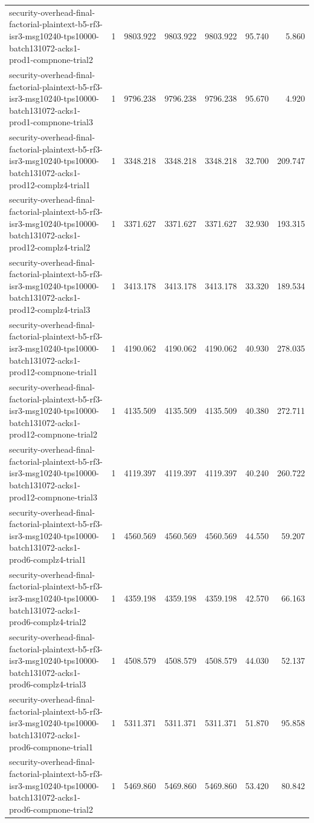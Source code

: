 \begin{tabular}{lrrrrrr}
security-overhead-final-factorial-plaintext-b5-rf3-isr3-msg10240-tps10000-batch131072-acks1-prod1-compnone-trial2 & 1 & 9803.922 & 9803.922 & 9803.922 & 95.740 & 5.860 \\
security-overhead-final-factorial-plaintext-b5-rf3-isr3-msg10240-tps10000-batch131072-acks1-prod1-compnone-trial3 & 1 & 9796.238 & 9796.238 & 9796.238 & 95.670 & 4.920 \\
security-overhead-final-factorial-plaintext-b5-rf3-isr3-msg10240-tps10000-batch131072-acks1-prod12-complz4-trial1 & 1 & 3348.218 & 3348.218 & 3348.218 & 32.700 & 209.747 \\
security-overhead-final-factorial-plaintext-b5-rf3-isr3-msg10240-tps10000-batch131072-acks1-prod12-complz4-trial2 & 1 & 3371.627 & 3371.627 & 3371.627 & 32.930 & 193.315 \\
security-overhead-final-factorial-plaintext-b5-rf3-isr3-msg10240-tps10000-batch131072-acks1-prod12-complz4-trial3 & 1 & 3413.178 & 3413.178 & 3413.178 & 33.320 & 189.534 \\
security-overhead-final-factorial-plaintext-b5-rf3-isr3-msg10240-tps10000-batch131072-acks1-prod12-compnone-trial1 & 1 & 4190.062 & 4190.062 & 4190.062 & 40.930 & 278.035 \\
security-overhead-final-factorial-plaintext-b5-rf3-isr3-msg10240-tps10000-batch131072-acks1-prod12-compnone-trial2 & 1 & 4135.509 & 4135.509 & 4135.509 & 40.380 & 272.711 \\
security-overhead-final-factorial-plaintext-b5-rf3-isr3-msg10240-tps10000-batch131072-acks1-prod12-compnone-trial3 & 1 & 4119.397 & 4119.397 & 4119.397 & 40.240 & 260.722 \\
security-overhead-final-factorial-plaintext-b5-rf3-isr3-msg10240-tps10000-batch131072-acks1-prod6-complz4-trial1 & 1 & 4560.569 & 4560.569 & 4560.569 & 44.550 & 59.207 \\
security-overhead-final-factorial-plaintext-b5-rf3-isr3-msg10240-tps10000-batch131072-acks1-prod6-complz4-trial2 & 1 & 4359.198 & 4359.198 & 4359.198 & 42.570 & 66.163 \\
security-overhead-final-factorial-plaintext-b5-rf3-isr3-msg10240-tps10000-batch131072-acks1-prod6-complz4-trial3 & 1 & 4508.579 & 4508.579 & 4508.579 & 44.030 & 52.137 \\
security-overhead-final-factorial-plaintext-b5-rf3-isr3-msg10240-tps10000-batch131072-acks1-prod6-compnone-trial1 & 1 & 5311.371 & 5311.371 & 5311.371 & 51.870 & 95.858 \\
security-overhead-final-factorial-plaintext-b5-rf3-isr3-msg10240-tps10000-batch131072-acks1-prod6-compnone-trial2 & 1 & 5469.860 & 5469.860 & 5469.860 & 53.420 & 80.842 \\

\end{tabular}
